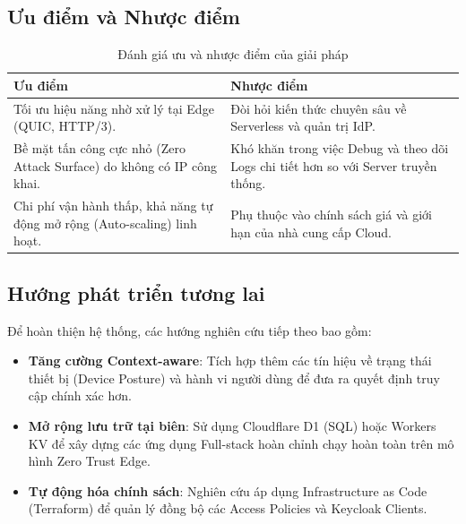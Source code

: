 \subsection{Ưu điểm và Nhược điểm}
\begin{table}[H]
\centering
\caption{Đánh giá ưu và nhược điểm của giải pháp}
\begin{tabular}{|p{7cm}|p{7cm}|}
\hline
\textbf{Ưu điểm} & \textbf{Nhược điểm} \\ \hline
Tối ưu hiệu năng nhờ xử lý tại Edge (QUIC, HTTP/3). & Đòi hỏi kiến thức chuyên sâu về Serverless và quản trị IdP. \\ \hline
Bề mặt tấn công cực nhỏ (Zero Attack Surface) do không có IP công khai. & Khó khăn trong việc Debug và theo dõi Logs chi tiết hơn so với Server truyền thống. \\ \hline
Chi phí vận hành thấp, khả năng tự động mở rộng (Auto-scaling) linh hoạt. & Phụ thuộc vào chính sách giá và giới hạn của nhà cung cấp Cloud. \\ \hline
\end{tabular}
\end{table}
\newpage
\subsection{Hướng phát triển tương lai}
Để hoàn thiện hệ thống, các hướng nghiên cứu tiếp theo bao gồm:
\begin{itemize}
\item \textbf{Tăng cường Context-aware}: Tích hợp thêm các tín hiệu về trạng thái thiết bị (Device Posture) và hành vi người dùng để đưa ra quyết định truy cập chính xác hơn.
\item \textbf{Mở rộng lưu trữ tại biên}: Sử dụng Cloudflare D1 (SQL) hoặc Workers KV để xây dựng các ứng dụng Full-stack hoàn chỉnh chạy hoàn toàn trên mô hình Zero Trust Edge.
\item \textbf{Tự động hóa chính sách}: Nghiên cứu áp dụng Infrastructure as Code (Terraform) để quản lý đồng bộ các Access Policies và Keycloak Clients.
\end{itemize}

